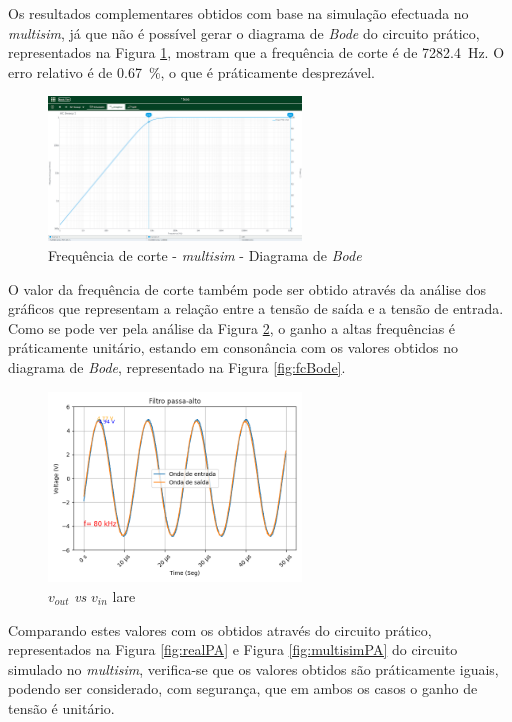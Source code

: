 Os resultados complementares obtidos com base na simulação efectuada no \textit{multisim}, já que não é possível gerar o diagrama de \textit{Bode} do circuito prático, representados na Figura \ref{fig:fcBodemultisim}, mostram que a frequência de corte é de \SI{7282.4}{\hertz}. O erro relativo é de \SI{0.67}{\percent}, o que é práticamente desprezável.

\begin{figure}[hbtp]
	\centering
	\includegraphics[width=0.6\textwidth]{figures/boda_HPF_fc.png}
	\caption{Frequência de corte - \textit{multisim} - Diagrama de \textit{Bode}}
	\label{fig:fcBodemultisim}
\end{figure}

O valor da frequência de corte também pode ser obtido através da análise dos gráficos que representam a relação entre a tensão de saída e a tensão de entrada. Como se pode ver pela análise da Figura \ref{fig:voutvinlare}, o ganho a altas frequências é práticamente unitário, estando em consonância com os valores obtidos no diagrama de \textit{Bode}, representado na Figura \ref{fig:fcBode}. 

\begin{figure}[hbtp]
	\centering
	\includegraphics[width=0.6\textwidth]{figures/filtro_passa-alto.png}
	\caption{$v_{out}$ \textit{vs} $v_{in}$ \acrshort{lare}}
	\label{fig:voutvinlare}
\end{figure}

Comparando estes valores com os obtidos através do circuito prático, representados na Figura \ref{fig:realPA} e Figura \ref{fig:multisimPA} do circuito simulado no \textit{multisim}, verifica-se que os valores obtidos são práticamente iguais, podendo ser considerado, com segurança, que em ambos os casos o ganho de tensão é unitário. 

